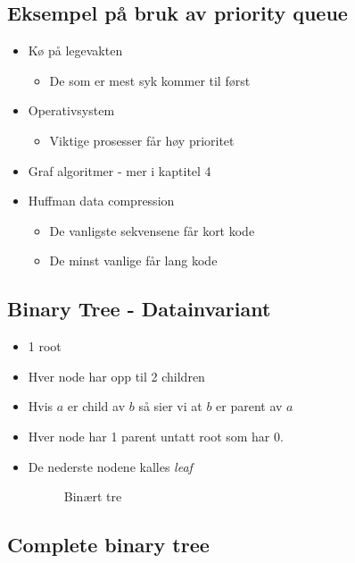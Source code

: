 \documentclass{article}
\begin{document}
    \subsection{Eksempel på bruk av priority queue}

    \begin{itemize}
        \item  Kø på legevakten
        \begin{itemize}
            \item De som er mest syk kommer til først
        \end{itemize}
    \item Operativsystem
        \begin{itemize}
            \item Viktige prosesser får høy prioritet
        \end{itemize}
    \item Graf algoritmer - mer i kaptitel 4
    \item Huffman data compression
        \begin{itemize}
            \item De vanligste sekvensene får kort kode
            \item De minst vanlige får lang kode
        \end{itemize}
    \end{itemize}

    \subsection{Binary Tree - Datainvariant}
    \begin{itemize}
        \item 1 root
        \item Hver node har opp til 2 children
        \item Hvis \( a \) er child av \( b \) så sier vi at \( b \) er parent av \( a \)
        \item Hver node har 1 parent untatt root som har 0.
        \item De nederste nodene kalles \textit{leaf}
    \begin{figure}[H]
	\centering
    \caption{Binært tre}
    \end{figure}
    \end{itemize}

    \subsection{Complete binary tree}
\end{document}
